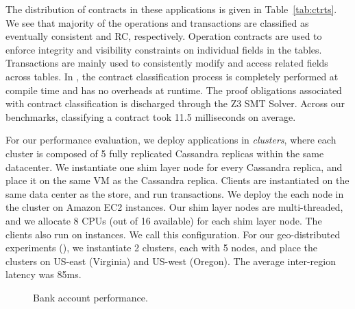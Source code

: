 The distribution of contracts in these applications is given in
Table~\ref{tab:ctrts}. We see that majority of the operations and transactions
are classified as eventually consistent and RC, respectively. Operation
contracts are used to enforce integrity and visibility constraints on
individual fields in the tables. Transactions are mainly used to consistently
modify and access related fields across tables. In \quelea, the contract
classification process is completely performed at compile time and has no
overheads at runtime. The proof obligations associated with contract
classification is discharged through the Z3 SMT Solver. Across our benchmarks,
classifying a contract took 11.5 milliseconds on average.

For our performance evaluation, we deploy \quelea applications in
\emph{clusters}, where each cluster is composed of 5 fully replicated Cassandra
replicas within the same datacenter. We instantiate one shim layer node for
every Cassandra replica, and place it on the same VM as the Cassandra replica.
Clients are instantiated on the same data center as the store, and run
transactions. We deploy the each node in the cluster on  Amazon
EC2 instances. Our shim layer nodes are multi-threaded, and we allocate 8 CPUs
(out of 16 available) for each shim layer node. The clients also run on
 instances. We call this  configuration. For our
geo-distributed experiments (), we instantiate 2 clusters, each with 5
nodes, and place the clusters on US-east (Virginia) and US-west (Oregon). The
average inter-region latency was 85ms.

\begin{figure}[t]
  \centering
	\caption{Bank account performance.}
  \label{grf:BA}
\end{figure}


